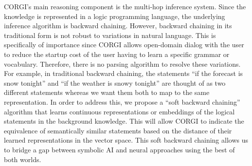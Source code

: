 CORGI's main reasoning component is the multi-hop inference system. Since the knowledge is represented in a logic programming language, the underlying inference algorithm is backward chaining. However, backward chaining in its traditional form is not robust to variations in natural language. This is specifically of importance since CORGI allows open-domain dialog with the user
to reduce the startup cost of the user having to learn a %
specific grammar or vocabulary. Therefore, there is no parsing algorithm to resolve these variations. For example, in 
traditional backward chaining, the statements ``if the forecast is snow tonight'' and ``if the weather is snowy tonight'' are thought of as two different statements whereas we want them both to map to the same representation. In order to address this, we propose a ``soft backward chaining'' algorithm that learns continuous representations or embeddings of the logical statements in the background knowledge. This will allow CORGI to indicate the equivalence of semantically similar statements based on the distance of their learned representations in the vector space. This soft backward chaining allows us to bridge a gap between symbolic AI and neural approaches using the best of both worlds.






